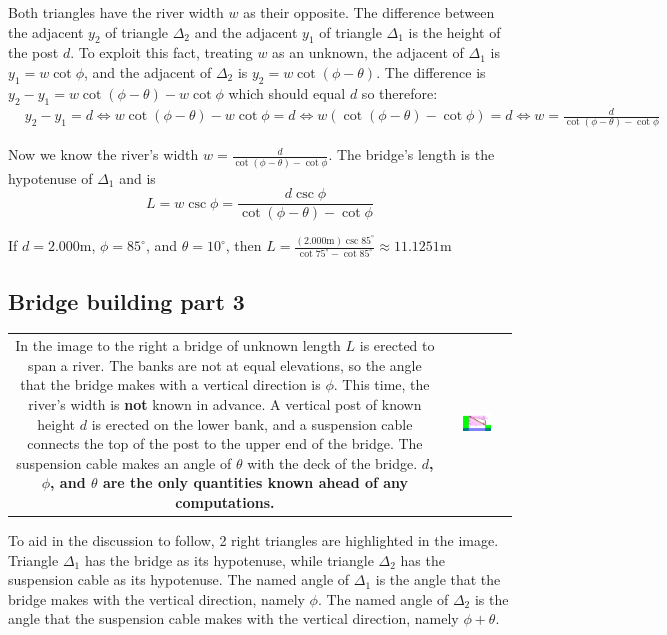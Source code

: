 \documentclass{article}
\begin{document}
Both triangles have the river width \(w\) as their opposite. The difference between the adjacent \(y_2\) of triangle \(\Delta_2\) and the adjacent \(y_1\) of triangle \(\Delta_1\) is the height of the post \(d\). To exploit this fact, treating \(w\) as an unknown, the adjacent of \(\Delta_1\) is \(y_1 = w\cot\phi\), and the adjacent of \(\Delta_2\) is \(y_2 = w\cot(\phi - \theta)\). The difference is \(y_2 - y_1 = w\cot(\phi - \theta) - w\cot\phi\) which should equal \(d\) so therefore:
\begin{align*}
& y_2 - y_1 = d 
\iff w\cot(\phi - \theta) - w\cot\phi = d
\iff w(\cot(\phi - \theta) - \cot\phi) = d 
\iff w = \frac{d}{\cot(\phi - \theta) - \cot\phi}
\end{align*}

Now we know the river's width \(w = \frac{d}{\cot(\phi - \theta) - \cot\phi}\). The bridge's length is the hypotenuse of \(\Delta_1\) and is 
\[L = w\csc\phi = \frac{d\csc\phi}{\cot(\phi - \theta) - \cot\phi}\]

If \(d = 2.000\text{m}\), \(\phi = 85^\circ\), and \(\theta = 10^\circ\), then \(L = \frac{(2.000\text{m})\csc 85^\circ}{\cot 75^\circ - \cot 85^\circ} \approx 11.1251\text{m}\)



\pagebreak

\subsection*{Bridge building part 3}

\begin{tabular}{cc}
\parbox{0.5\textwidth}{
In the image to the right a bridge of unknown length \(L\) is erected to span a river. The banks are not at equal elevations, so the angle that the bridge makes with a vertical direction is \(\phi\). This time, the river's width is {\bf not} known in advance. A vertical post of known height \(d\) is erected on the lower bank, and a suspension cable connects the top of the post to the upper end of the bridge. The suspension cable makes an angle of \(\theta\) with the deck of the bridge.  {\bf \(d\), \(\phi\), and \(\theta\) are the only quantities known ahead of any computations.} 
} & \parbox{0.5\textwidth}{
\includegraphics[width = 0.5\textwidth]{bridge_building_3}
}
\end{tabular}
To aid in the discussion to follow, 2 right triangles are highlighted in the image. Triangle \(\Delta_1\) has the bridge as its hypotenuse, while triangle \(\Delta_2\) has the suspension cable as its hypotenuse. The named angle of \(\Delta_1\) is the angle that the bridge makes with the vertical direction, namely \(\phi\). The named angle of \(\Delta_2\) is the angle that the suspension cable makes with the vertical direction, namely \(\phi + \theta\). 
\end{document}
